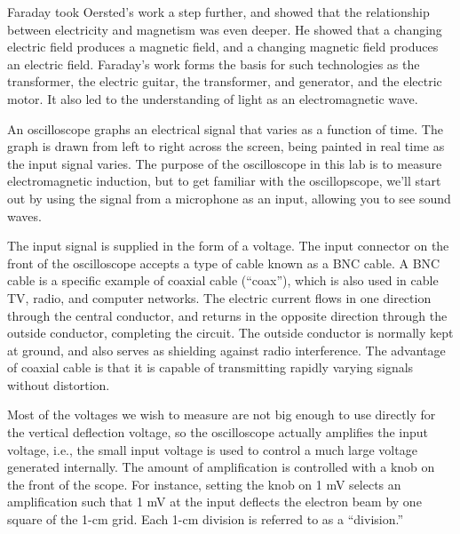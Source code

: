 Faraday took Oersted's work a step further, and showed that
the relationship between electricity and magnetism was even
deeper. He showed that a changing electric field produces a
magnetic field, and a changing magnetic field produces an
electric field. Faraday's work forms the basis for such
technologies as the transformer, the electric guitar, the
transformer, and generator, and the electric motor. It also
led to the understanding of light as an electromagnetic wave.



An oscilloscope graphs an electrical signal that varies as
a function of time.
The graph is drawn from left to right across the screen,
being painted in real time as the input signal varies.
The purpose of the oscilloscope in this lab is to measure
electromagnetic induction, but to get familiar with the oscillopscope, we'll start out by
using the signal from a microphone as an input,
allowing you to see sound waves. 

The input signal is
supplied in the form of a voltage.
The input connector on the front of the oscilloscope
accepts a type of cable
known as a BNC cable.
A BNC cable is a specific example of coaxial cable
(``coax''), which is also used in cable TV, radio, and
computer networks. The electric current flows in one direction
through the central conductor, and returns in the opposite
direction through the outside conductor, completing the
circuit. The outside conductor is normally kept at ground,
and also serves as shielding against radio interference. 
The advantage of coaxial cable is that it is capable of
transmitting rapidly varying signals without distortion.


Most of the voltages we wish to measure are not big enough
to use directly for the vertical deflection voltage, so the
oscilloscope actually amplifies the input voltage, i.e., the
small input voltage is used to control a much large voltage
generated internally. The amount of amplification is
controlled with a knob on the front of the scope. For
instance, setting the knob on 1 mV selects an amplification
such that 1 mV at the input deflects the electron beam by
one square of the 1-cm grid. Each 1-cm division is referred
to as a ``division.''


